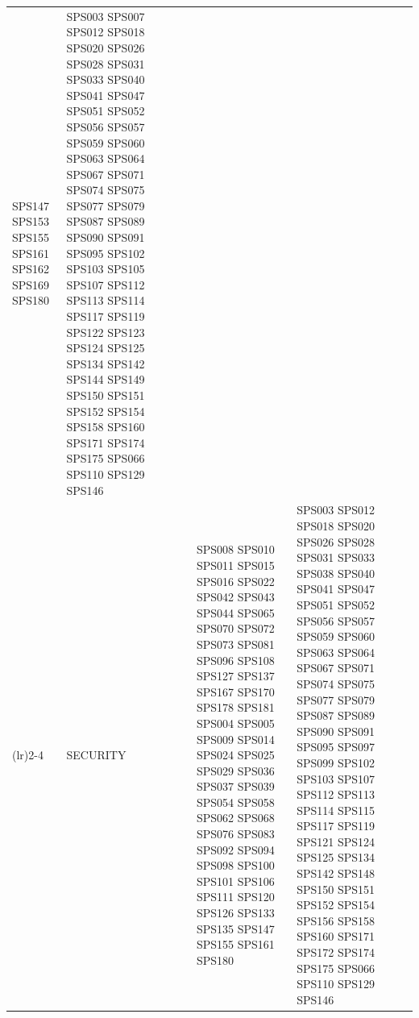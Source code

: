 \begin{table}[htbp]
\begin{tabularx}{\textwidth}{p{0.5cm}p{1.5cm}>{\raggedright\arraybackslash}X>{\raggedright\arraybackslash}X>{\raggedright\arraybackslash}X}
																		  SPS147 SPS153 SPS155 SPS161 SPS162 SPS169 
																		  SPS180  									& SPS003 SPS007 SPS012 SPS018 SPS020 SPS026 
																													  SPS028 SPS031 SPS033 SPS040 SPS041 SPS047 
																													  SPS051 SPS052 SPS056 SPS057 SPS059 SPS060 
																													  SPS063 SPS064 SPS067 SPS071 SPS074 SPS075 
																													  SPS077 SPS079 SPS087 SPS089 SPS090 SPS091 
																													  SPS095 SPS102 SPS103 SPS105 SPS107 SPS112 
																													  SPS113 SPS114 SPS117 SPS119 SPS122 SPS123 
																													  SPS124 SPS125 SPS134 SPS142 SPS144 SPS149 
																													  SPS150 SPS151 SPS152 SPS154 SPS158 SPS160 
																													  SPS171 SPS174 SPS175 SPS066 SPS110 SPS129 
																													  SPS146 									\\
		\addlinespace[0.3em]
		\cmidrule(lr){2-4}
		                                      & SECURITY                & SPS008 SPS010 SPS011 SPS015 SPS016 SPS022 
																		  SPS042 SPS043 SPS044 SPS065 SPS070 SPS072 
																		  SPS073 SPS081 SPS096 SPS108 SPS127 SPS137 
																		  SPS167 SPS170 SPS178 SPS181 SPS004 SPS005 
																		  SPS009 SPS014 SPS024 SPS025 SPS029 SPS036 
																		  SPS037 SPS039 SPS054 SPS058 SPS062 SPS068 
																		  SPS076 SPS083 SPS092 SPS094 SPS098 SPS100 
																		  SPS101 SPS106 SPS111 SPS120 SPS126 SPS133 
																		  SPS135 SPS147 SPS155 SPS161 SPS180     	& SPS003 SPS012 SPS018 SPS020 SPS026 SPS028 
																													  SPS031 SPS033 SPS038 SPS040 SPS041 SPS047 
																													  SPS051 SPS052 SPS056 SPS057 SPS059 SPS060 
																													  SPS063 SPS064 SPS067 SPS071 SPS074 SPS075 
																													  SPS077 SPS079 SPS087 SPS089 SPS090 SPS091 
																													  SPS095 SPS097 SPS099 SPS102 SPS103 SPS107 
																													  SPS112 SPS113 SPS114 SPS115 SPS117 SPS119 
																													  SPS121 SPS124 SPS125 SPS134 SPS142 SPS148 
																													  SPS150 SPS151 SPS152 SPS154 SPS156 SPS158 
																													  SPS160 SPS171 SPS172 SPS174 SPS175 SPS066 
																													  SPS110 SPS129 SPS146                       \\
		

\end{tabularx}
\end{table}
